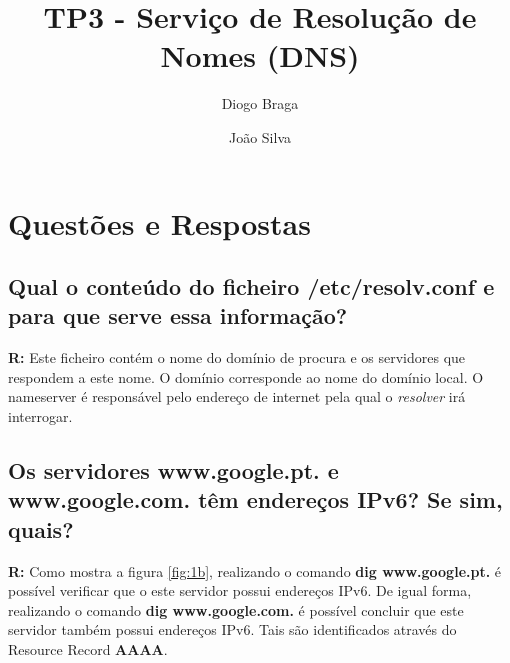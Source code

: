 \documentclass{llncs}
\begin{document}
\mainmatter
\title{TP3 - Serviço de Resolução de Nomes (DNS)}


\author{Diogo Braga \and João Silva}



\date{}


\maketitle

\section{Questões e Respostas}

\subsection{\textbf{Qual o conteúdo do ficheiro /etc/resolv.conf e para que serve essa informação?}}
\textbf{R:} Este ficheiro contém o nome do domínio de procura e os servidores que respondem a este nome. O domínio corresponde ao nome do domínio local. O nameserver é responsável pelo endereço de internet pela qual o \textit{resolver} irá interrogar.

\subsection{\textbf{Os servidores www.google.pt. e www.google.com. têm endereços IPv6? Se sim, quais?}}
\textbf{R:} Como mostra a figura \ref{fig:1b}, realizando o comando \textbf{dig www.google.pt.} é possível verificar que o este servidor possui endereços IPv6. De igual forma, realizando o comando \textbf{dig www.google.com.} é possível concluir que este servidor também possui endereços IPv6. Tais são identificados através do Resource Record \textbf{AAAA}.
\end{document}
